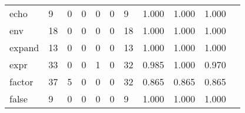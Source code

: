 \begin{longtable}{lp{1.2cm}p{1.2cm}p{1.2cm}p{1.2cm}p{1.2cm}p{1.2cm}p{1.2cm}p{1.2cm}p{1.2cm}p{1.2cm}}
echo      &                                     9 &                                                  0 &                                                  0 &                                                  0 &                                                  0 &                                                  9 &                                         1.000 &                                              1.000 &                                              1.000 \\
env       &                                    18 &                                                  0 &                                                  0 &                                                  0 &                                                  0 &                                                 18 &                                         1.000 &                                              1.000 &                                              1.000 \\
expand    &                                    13 &                                                  0 &                                                  0 &                                                  0 &                                                  0 &                                                 13 &                                         1.000 &                                              1.000 &                                              1.000 \\
expr      &                                    33 &                                                  0 &                                                  0 &                                                  1 &                                                  0 &                                                 32 &                                         0.985 &                                              1.000 &                                              0.970 \\
factor    &                                    37 &                                                  5 &                                                  0 &                                                  0 &                                                  0 &                                                 32 &                                         0.865 &                                              0.865 &                                              0.865 \\
false     &                                     9 &                                                  0 &                                                  0 &                                                  0 &                                                  0 &                                                  9 &                                         1.000 &                                              1.000 &                                              1.000 \\

\end{longtable}
